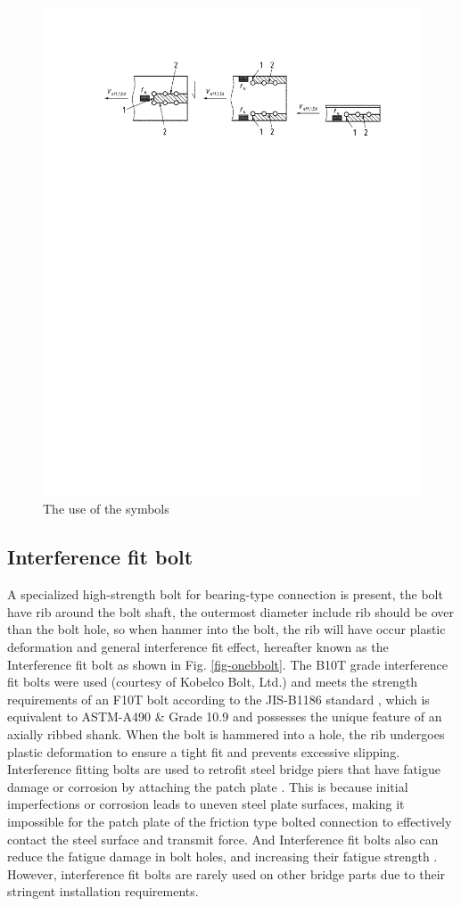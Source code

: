 \begin{figure}
    \centering
    \includegraphics[width=0.7\linewidth]{imgs/ch2/ch2figeu5-13.pdf}
    \caption{The use of the symbols}
    \label{ch2figeu5-13}
\end{figure}


\subsection{Interference fit bolt}

A specialized high-strength bolt for bearing-type connection is present, the bolt have rib around the bolt shaft, the outermost diameter include rib should be over than the bolt hole, so when hanmer into the bolt, the rib will have occur plastic deformation and general interference fit effect, hereafter known as the Interference fit bolt \cite{Kulak1988guide,bolt-bearing,Chen2023MechanicalConnections} as shown in Fig. \ref{fig-onebbolt}. The B10T grade interference fit bolts were used (courtesy of Kobelco Bolt, Ltd.) and meets the strength requirements of an F10T bolt according to the JIS-B1186 standard \cite{jis2018JIS}, which is equivalent to ASTM-A490 \cite{ASTM-bolt} \& Grade 10.9 \cite{ISO-bolt} and possesses the unique feature of an axially ribbed shank. When the bolt is hammered into a hole, the rib undergoes plastic deformation to ensure a tight fit and prevents excessive slipping. Interference fitting bolts are used to retrofit steel bridge piers that have fatigue damage or corrosion by attaching the patch plate \cite{Anami-bbolt-ate}. This is because initial imperfections or corrosion leads to uneven steel plate surfaces, making it impossible for the patch plate of the friction type bolted connection to effectively contact the steel surface and transmit force. And Interference fit bolts also can reduce the fatigue damage in bolt holes, and increasing their fatigue strength \cite{Guo20205}. However, interference fit bolts are rarely used on other bridge parts due to their stringent installation requirements. 

